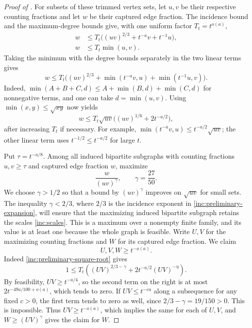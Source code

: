 \begin{proof}[Proof of ]
For subsets of these trimmed vertex sets, let \(u,v\) be their
respective counting fractions and let \(w\) be their captured edge
fraction. The incidence bound and the maximum-degree bounds give,
with one uniform factor \(T_t=t^{o(a)}\),
\begin{align}
 w&\le T_t\bigl((uv)^{2/3}+t^{-a}v+t^{-1}u\bigr),
 \label{inc:preliminary-expansion}\\
 w&\le T_t\min(u,v).\nonumber
\end{align}
Taking the minimum with the degree bounds separately in the two linear
terms gives
\[
 w\le T_t\bigl((uv)^{2/3}
       +\min(t^{-a}v,u)+\min(t^{-1}u,v)\bigr).
\]
Indeed, \(\min(A+B+C,d)\le A+\min(B,d)+\min(C,d)\)
for nonnegative terms, and one can take \(d=\min(u,v)\).
Using \(\min(x,y)\le\sqrt{xy}\) now yields
\begin{equation}\label{inc:preliminary-square-root}
 w\le T_t\sqrt{uv}
       \bigl((uv)^{1/6}+2t^{-a/2}\bigr),
\end{equation}
after increasing \(T_t\) if necessary. For example,
\(\min(t^{-a}v,u)\le t^{-a/2}\sqrt{uv}\); the other linear term
uses \(t^{-1/2}\le t^{-a/2}\) for large \(t\).

Put \(\tau=t^{-a/8}\). Among all induced bipartite subgraphs with counting
fractions \(u,v\ge\tau\) and captured edge fraction \(w\), maximize
\[
 \frac{w}{(uv)^\gamma},\qquad \gamma=\frac{27}{50}.
\]
We choose \(\gamma>1/2\) so that a bound by \((uv)^\gamma\)
improves on \(\sqrt{uv}\) for small sets. The inequality
\(\gamma<2/3\), where \(2/3\) is the incidence exponent in
\eqref{inc:preliminary-expansion}, will ensure that the maximizing
induced bipartite subgraph retains the scales \eqref{inc:scales}.
This is a maximum over a nonempty finite family, and its value is at
least one because the whole graph is feasible. Write \(U,V\)
for the maximizing counting fractions and \(W\) for its captured
edge fraction. We claim
\begin{equation}\label{inc:winning-fractions}
 U,V,W\ge t^{-o(a)}.
\end{equation}
Indeed \eqref{inc:preliminary-square-root} gives
\[
 1\le T_t\left((UV)^{2/3-\gamma}
       +2t^{-a/2}(UV)^{-\eta}\right).
\]
By feasibility, \(UV\ge t^{-a/4}\), so the second term on the right
is at most \(2t^{-49a/100+o(a)}\), which tends to zero. If
\(UV\le t^{-ca}\) along a subsequence for any fixed \(c>0\), the
first term tends to zero as well, since
\(2/3-\gamma=19/150>0\). This is impossible. Thus
\(UV\ge t^{-o(a)}\), which implies the same for each of \(U,V\),
and \(W\ge(UV)^\gamma\) gives the claim for \(W\).


\end{proof}
